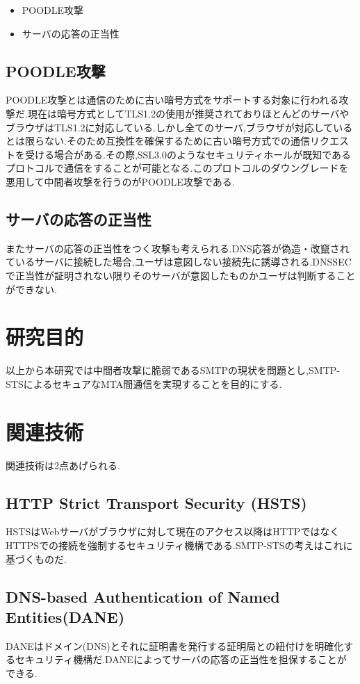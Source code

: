 \documentclass[a4j,10pt]{jsarticle}
\begin{document}
\begin{itemize}
\item POODLE攻撃 
\item サーバの応答の正当性
\end{itemize}

\subsection{POODLE攻撃}
POODLE攻撃とは通信のために古い暗号方式をサポートする対象に行われる攻撃だ.現在は暗号方式としてTLS1.2の使用が推奨されておりほとんどのサーバやブラウザはTLS1.2に対応している.しかし全てのサーバ,ブラウザが対応しているとは限らない.そのため互換性を確保するために古い暗号方式での通信リクエストを受ける場合がある.その際,SSL3.0のようなセキュリティホールが既知であるプロトコルで通信をすることが可能となる.このプロトコルのダウングレードを悪用して中間者攻撃を行うのがPOODLE攻撃である.

\subsection{サーバの応答の正当性}
またサーバの応答の正当性をつく攻撃も考えられる.DNS応答が偽造・改竄されているサーバに接続した場合,ユーザは意図しない接続先に誘導される.DNSSECで正当性が証明されない限りそのサーバが意図したものかユーザは判断することができない.

\section{研究目的}

以上から本研究では中間者攻撃に脆弱であるSMTPの現状を問題とし,SMTP-STSによるセキュアなMTA間通信を実現することを目的にする.


\section{関連技術}

関連技術は2点あげられる.

\subsection{HTTP Strict Transport Security (HSTS)}
HSTSはWebサーバがブラウザに対して現在のアクセス以降はHTTPではなくHTTPSでの接続を強制するセキュリティ機構である.SMTP-STSの考えはこれに基づくものだ.

\subsection{DNS-based Authentication of Named Entities(DANE)}
DANEはドメイン(DNS)とそれに証明書を発行する証明局との紐付けを明確化するセキュリティ機構だ.DANEによってサーバの応答の正当性を担保することができる.
\end{document}
